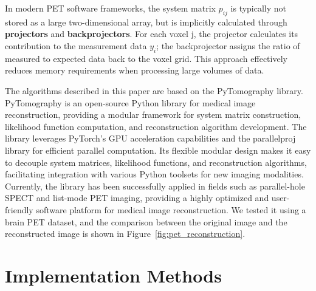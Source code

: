 \documentclass[
reprint,
superscriptaddress,
nofootinbib,
amsmath,amssymb,
aps,
prd,
]{revtex4-2}
\begin{document}
In modern PET software frameworks, the system matrix $p_{ij}$ is typically not stored as a large two-dimensional array, but is implicitly calculated through \textbf{projectors} and \textbf{backprojectors}. For each voxel j, the projector calculates its contribution to the measurement data $y_i$; the backprojector assigns the ratio of measured to expected data back to the voxel grid. This approach effectively reduces memory requirements when processing large volumes of data.

The algorithms described in this paper are based on the PyTomography library\cite{POLSON2025102020}. PyTomography is an open-source Python library for medical image reconstruction, providing a modular framework for system matrix construction, likelihood function computation, and reconstruction algorithm development. The library leverages PyTorch's GPU acceleration capabilities and the parallelproj library for efficient parallel computation. Its flexible modular design makes it easy to decouple system matrices, likelihood functions, and reconstruction algorithms, facilitating integration with various Python toolsets for new imaging modalities. Currently, the library has been successfully applied in fields such as parallel-hole SPECT and list-mode PET imaging, providing a highly optimized and user-friendly software platform for medical image reconstruction. We tested it using a brain PET dataset, and the comparison between the original image and the reconstructed image is shown in Figure~\ref{fig:pet_reconstruction}.





\section{Implementation Methods}
\label{chap:methods}
\end{document}
